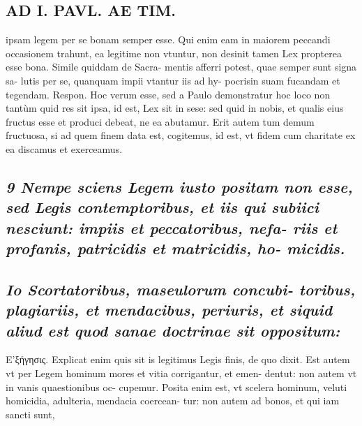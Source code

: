 \documentclass{article}
\begin{document}
\begin{pages}
\section*{AD I. PAVL. AE TIM. }
\marginpar{[ p.20 ]}\pstart ipsam legem per se bonam semper esse. Qui enim eam in maiorem peccandi occasionem trahunt, ea legitime non vtuntur, non desinit tamen Lex propterea esse bona. Simile quiddam de Sacra- mentis afferri potest, quae semper sunt signa sa- lutis per se, quanquam impii vtantur iis ad hy- pocrisin suam fucandam et tegendam. Respon. Hoc verum esse, sed a Paulo demonstratur hoc loco non tantùm quid res sit ipsa, id est, Lex sit in sese: sed quid in nobis, et qualis eius fructus esse et produci debeat, ne ea abutamur. Erit autem tum demum fructuosa, si ad quem finem data est, cogitemus, id est, vt fidem cum charitate ex ea discamus et exerceamus.  \pend
{}
{}
\subsection*{\textit{9 Nempe sciens Legem iusto positam non esse, sed Legis contemptoribus, et iis qui subiici nesciunt: impiis et peccatoribus, nefa- riis et profanis, patricidis et matricidis, ho- micidis. }}
{}
\subsection*{\textit{Io Scortatoribus, maseulorum concubi- toribus, plagiariis, et mendacibus, periuris, et siquid aliud est quod sanae doctrinae sit oppositum: }}\pstart E’ξήγησις. Explicat enim quis sit is legitimus Legis finis, de quo dixit. Est autem vt per Legem hominum mores et vitia corrigantur, et emen- dentut: non autem vt in vanis quaestionibus oc- cupemur. Posita enim est, vt scelera hominum, veluti homicidia, adulteria, mendacia coercean- tur: non autem ad bonos, et qui iam sancti sunt,  \pend

\end{pages}
\end{document}
